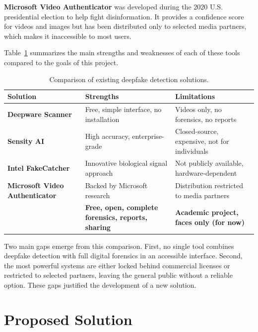 \textbf{Microsoft Video Authenticator} was developed during the 2020 U.S. presidential election to help fight disinformation. It provides a confidence score for videos and images but has been distributed only to selected media partners, which makes it inaccessible to most users.

Table~\ref{tab:existing-solutions} summarizes the main strengths and weaknesses of each of these tools compared to the goals of this project.

\begin{table}[H]
\centering
\renewcommand{\arraystretch}{1.4}
\setlength{\tabcolsep}{6pt}
\begin{tabularx}{\textwidth}{|>{\bfseries}l|X|X|}
\hline
\rowcolor{deeplight}
\textbf{Solution} & \textbf{Strengths} & \textbf{Limitations} \\
\hline
Deepware Scanner & Free, simple interface, no installation & Videos only, no forensics, no reports \\
\hline
Sensity AI & High accuracy, enterprise-grade & Closed-source, expensive, not for individuals \\
\hline
Intel FakeCatcher & Innovative biological signal approach & Not publicly available, hardware-dependent \\
\hline
Microsoft Video Authenticator & Backed by Microsoft research & Distribution restricted to media partners \\
\hline
\rowcolor{deeplight}
\textbf{\projectname{}} & \textbf{Free, open, complete forensics, reports, sharing} & \textbf{Academic project, faces only (for now)} \\
\hline
\end{tabularx}
\caption{Comparison of existing deepfake detection solutions.}
\label{tab:existing-solutions}
\end{table}

Two main gaps emerge from this comparison. First, no single tool combines deepfake detection with full digital forensics in an accessible interface. Second, the most powerful systems are either locked behind commercial licenses or restricted to selected partners, leaving the general public without a reliable option. These gaps justified the development of a new solution.

\section{Proposed Solution}

